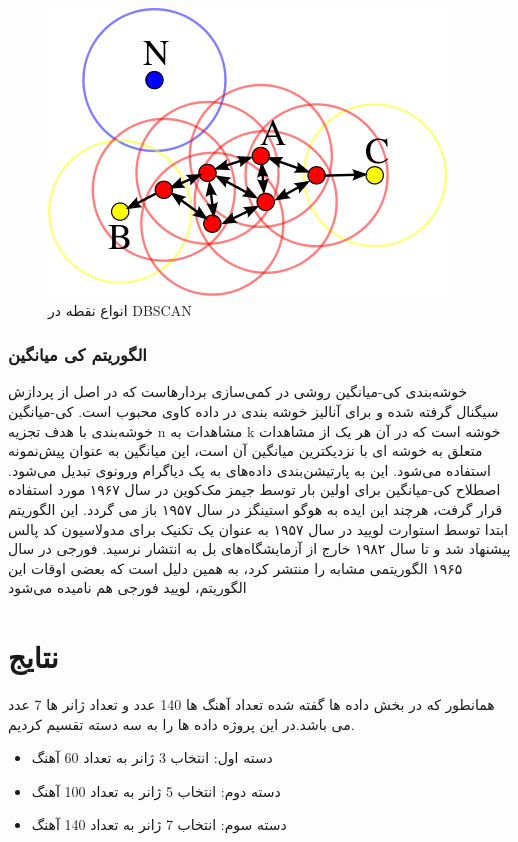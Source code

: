\documentclass[conference]{IEEEtran}
\begin{document}
\begin{figure}[h!]
\includegraphics[width=\linewidth]{10.png}
      \caption{ انواع نقطه در DBSCAN  }
      \label{fig:fig 1}
    \end{figure}
        \subsubsection{ الگوریتم کی میانگین } 
خوشه‌بندی کی-میانگین روشی در کمی‌سازی بردارهاست که در اصل از پردازش سیگنال گرفته شده و برای آنالیز خوشه بندی در داده کاوی محبوب است. کی-میانگین خوشه‌بندی با هدف تجزیه n مشاهدات به k خوشه است که در آن هر یک از مشاهدات متعلق به خوشه ای با نزدیکترین میانگین آن است، این میانگین به عنوان پیش‌نمونه استفاده می‌شود. این به پارتیشن‌بندی داده‌های به یک دیاگرام ورونوی    تبدیل می‌شود.
اصطلاح کی-میانگین برای اولین بار توسط جیمز مک‌کوین در سال ۱۹۶۷ مورد استفاده قرار گرفت، هرچند این ایده به هوگو استینگز در سال ۱۹۵۷ باز می گردد. این الگوریتم ابتدا توسط استوارت لویید در سال ۱۹۵۷ به عنوان یک تکنیک برای مدولاسیون کد پالس پیشنهاد شد و تا سال ۱۹۸۲ خارج از آزمایشگاه‌های بل به انتشار نرسید. فورجی در سال ۱۹۶۵ الگوریتمی مشابه را منتشر کرد، به همین دلیل است که بعضی اوقات این الگوریتم، لویید فورجی هم نامیده می‌شود

\section{نتایج}
همانطور که در بخش داده ها گفته شده تعداد آهنگ ها 140 عدد و تعداد ژانر ها 7 عدد می باشد.در این پروژه داده ها را به سه دسته تقسیم کردیم. 
\begin{itemize}
    \item دسته اول: انتخاب 3 ژانر به تعداد 60 آهنگ 
    \item دسته دوم: انتخاب 5 ژانر به تعداد 100 آهنگ
    \item دسته سوم: انتخاب 7 ژانر به تعداد 140 آهنگ
\end{itemize}
\end{document}
